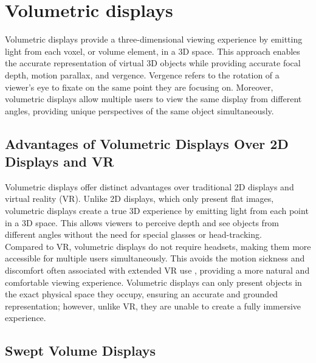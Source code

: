 \section{Volumetric displays}

Volumetric displays \cite{1492264} provide a three-dimensional viewing experience by emitting light from each voxel, or volume element, in a 3D space. This approach enables the accurate representation of virtual 3D objects while providing accurate focal depth, motion parallax, and vergence. Vergence refers to the rotation of a viewer's eye to fixate on the same point they are focusing on. Moreover, volumetric displays allow multiple users to view the same display from different angles, providing unique perspectives of the same object simultaneously.

\subsection{Advantages of Volumetric Displays Over 2D Displays and VR}

Volumetric displays offer distinct advantages over traditional 2D displays and virtual reality (VR). Unlike 2D displays, which only present flat images, volumetric displays create a true 3D experience by emitting light from each point in a 3D space. This allows viewers to perceive depth and see objects from different angles without the need for special glasses or head-tracking. \\

Compared to VR, volumetric displays do not require headsets, making them more accessible for multiple users simultaneously. This avoids the motion sickness and discomfort often associated with extended VR use \cite{doi:10.1080/10447318.2020.1778351}, providing a more natural and comfortable viewing experience. Volumetric displays can only present objects in the exact physical space they occupy, ensuring an accurate and grounded representation; however, unlike VR, they are unable to create a fully immersive experience.

\subsection{Swept Volume Displays}

